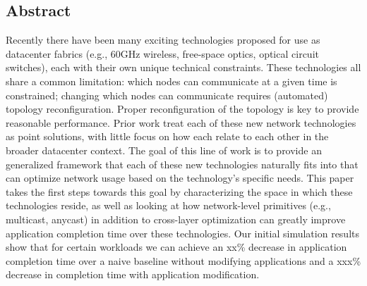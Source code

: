 \subsection*{Abstract}
Recently there have been many exciting technologies proposed for use as
datacenter fabrics (e.g., 60GHz wireless, free-space optics, optical circuit
switches), each with their own unique technical constraints. These technologies
all share a common limitation: which nodes can communicate at a given time is
constrained; changing which nodes can communicate requires (automated) topology
reconfiguration. Proper reconfiguration of the topology is key to provide
reasonable performance. Prior work treat each of these new network technologies
as point solutions, with little focus on how each relate to each other in the
broader datacenter context. The goal of this line of work is to provide an
generalized framework that each of these new technologies naturally fits into
that can optimize network usage based on the technology's specific needs. This
paper takes the first steps towards this goal by characterizing the space in
which these technologies reside, as well as looking at how network-level
primitives (e.g., multicast, anycast) in addition to cross-layer optimization
can greatly improve application completion time over these technologies. Our
initial simulation results show that for certain workloads we can achieve an
xx\% decrease in application completion time over a naive baseline without
modifying applications and a xxx\% decrease in completion time with application
modification.



